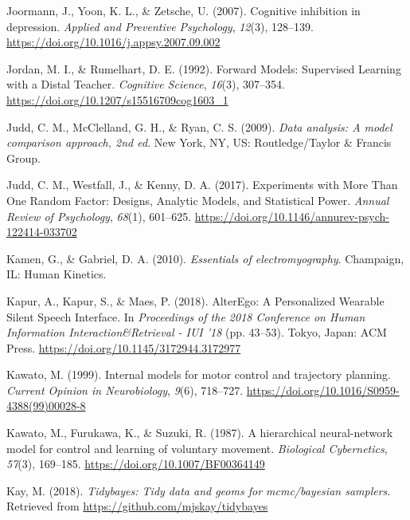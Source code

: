 \documentclass[a4paper,12pt,twoside,openright,oldfontcommands,final]{memoir}
\begin{document}
\leavevmode\hypertarget{ref-joormann_cognitive_2007}{}%
Joormann, J., Yoon, K. L., \& Zetsche, U. (2007). Cognitive inhibition in depression. \emph{Applied and Preventive Psychology}, \emph{12}(3), 128--139. \url{https://doi.org/10.1016/j.appsy.2007.09.002}

\leavevmode\hypertarget{ref-jordan_forward_1992}{}%
Jordan, M. I., \& Rumelhart, D. E. (1992). Forward Models: Supervised Learning with a Distal Teacher. \emph{Cognitive Science}, \emph{16}(3), 307--354. \url{https://doi.org/10.1207/s15516709cog1603_1}

\leavevmode\hypertarget{ref-judd_data_2009}{}%
Judd, C. M., McClelland, G. H., \& Ryan, C. S. (2009). \emph{Data analysis: A model comparison approach, 2nd ed}. New York, NY, US: Routledge/Taylor \& Francis Group.

\leavevmode\hypertarget{ref-judd_experiments_2017}{}%
Judd, C. M., Westfall, J., \& Kenny, D. A. (2017). Experiments with More Than One Random Factor: Designs, Analytic Models, and Statistical Power. \emph{Annual Review of Psychology}, \emph{68}(1), 601--625. \url{https://doi.org/10.1146/annurev-psych-122414-033702}

\leavevmode\hypertarget{ref-kamen_essentials_2010}{}%
Kamen, G., \& Gabriel, D. A. (2010). \emph{Essentials of electromyography}. Champaign, IL: Human Kinetics.

\leavevmode\hypertarget{ref-kapur_alterego_2018}{}%
Kapur, A., Kapur, S., \& Maes, P. (2018). AlterEgo: A Personalized Wearable Silent Speech Interface. In \emph{Proceedings of the 2018 Conference on Human Information Interaction\&Retrieval - IUI '18} (pp. 43--53). Tokyo, Japan: ACM Press. \url{https://doi.org/10.1145/3172944.3172977}

\leavevmode\hypertarget{ref-kawato_internal_1999}{}%
Kawato, M. (1999). Internal models for motor control and trajectory planning. \emph{Current Opinion in Neurobiology}, \emph{9}(6), 718--727. \url{https://doi.org/10.1016/S0959-4388(99)00028-8}

\leavevmode\hypertarget{ref-kawato_hierarchical_1987}{}%
Kawato, M., Furukawa, K., \& Suzuki, R. (1987). A hierarchical neural-network model for control and learning of voluntary movement. \emph{Biological Cybernetics}, \emph{57}(3), 169--185. \url{https://doi.org/10.1007/BF00364149}

\leavevmode\hypertarget{ref-R-tidybayes}{}%
Kay, M. (2018). \emph{Tidybayes: Tidy data and geoms for mcmc/bayesian samplers}. Retrieved from \url{https://github.com/mjskay/tidybayes}
\end{document}

